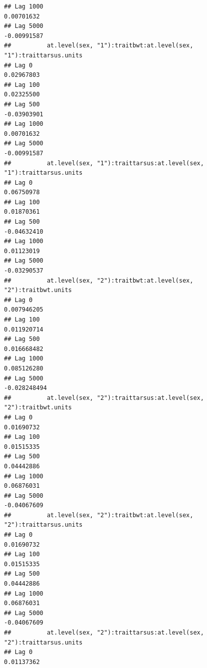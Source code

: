 \documentclass[
  12pt,
]{book}
\begin{document}
\begin{verbatim}
## Lag 1000                                                       0.00701632
## Lag 5000                                                      -0.00991587
##          at.level(sex, "1"):traitbwt:at.level(sex, "1"):traittarsus.units
## Lag 0                                                          0.02967803
## Lag 100                                                        0.02325500
## Lag 500                                                       -0.03903901
## Lag 1000                                                       0.00701632
## Lag 5000                                                      -0.00991587
##          at.level(sex, "1"):traittarsus:at.level(sex, "1"):traittarsus.units
## Lag 0                                                             0.06750978
## Lag 100                                                           0.01870361
## Lag 500                                                          -0.04632410
## Lag 1000                                                          0.01123019
## Lag 5000                                                         -0.03290537
##          at.level(sex, "2"):traitbwt:at.level(sex, "2"):traitbwt.units
## Lag 0                                                      0.007946205
## Lag 100                                                    0.011920714
## Lag 500                                                    0.016668482
## Lag 1000                                                   0.085126280
## Lag 5000                                                  -0.028248494
##          at.level(sex, "2"):traittarsus:at.level(sex, "2"):traitbwt.units
## Lag 0                                                          0.01690732
## Lag 100                                                        0.01515335
## Lag 500                                                        0.04442886
## Lag 1000                                                       0.06876031
## Lag 5000                                                      -0.04067609
##          at.level(sex, "2"):traitbwt:at.level(sex, "2"):traittarsus.units
## Lag 0                                                          0.01690732
## Lag 100                                                        0.01515335
## Lag 500                                                        0.04442886
## Lag 1000                                                       0.06876031
## Lag 5000                                                      -0.04067609
##          at.level(sex, "2"):traittarsus:at.level(sex, "2"):traittarsus.units
## Lag 0                                                             0.01137362

\end{verbatim}
\end{document}
